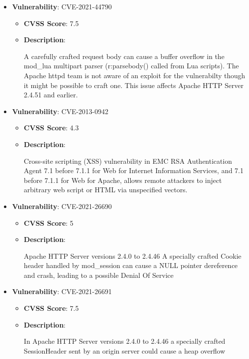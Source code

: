 \documentclass{article}
\begin{document}
\begin{itemize}
        \item \textbf{Vulnerability}: CVE-2021-44790
        \begin{itemize}
            \item \textbf{CVSS Score}:  7.5 
            \item \textbf{Description}:
            \parbox[t]{0.9\linewidth}{
                \ttfamily A carefully crafted request body can cause a buffer overflow in the mod\_lua multipart parser (r:parsebody() called from Lua scripts). The Apache httpd team is not aware of an exploit for the vulnerabilty though it might be possible to craft one. This issue affects Apache HTTP Server 2.4.51 and earlier.
            }
        \end{itemize}
    
        \item \textbf{Vulnerability}: CVE-2013-0942
        \begin{itemize}
            \item \textbf{CVSS Score}:  4.3 
            \item \textbf{Description}:
            \parbox[t]{0.9\linewidth}{
                \ttfamily Cross-site scripting (XSS) vulnerability in EMC RSA Authentication Agent 7.1 before 7.1.1 for Web for Internet Information Services, and 7.1 before 7.1.1 for Web for Apache, allows remote attackers to inject arbitrary web script or HTML via unspecified vectors.
            }
        \end{itemize}
    
        \item \textbf{Vulnerability}: CVE-2021-26690
        \begin{itemize}
            \item \textbf{CVSS Score}:  5 
            \item \textbf{Description}:
            \parbox[t]{0.9\linewidth}{
                \ttfamily Apache HTTP Server versions 2.4.0 to 2.4.46 A specially crafted Cookie header handled by mod\_session can cause a NULL pointer dereference and crash, leading to a possible Denial Of Service
            }
        \end{itemize}
    
        \item \textbf{Vulnerability}: CVE-2021-26691
        \begin{itemize}
            \item \textbf{CVSS Score}:  7.5 
            \item \textbf{Description}:
            \parbox[t]{0.9\linewidth}{
                \ttfamily In Apache HTTP Server versions 2.4.0 to 2.4.46 a specially crafted SessionHeader sent by an origin server could cause a heap overflow
            }
        \end{itemize}
    

\end{itemize}
\end{document}
